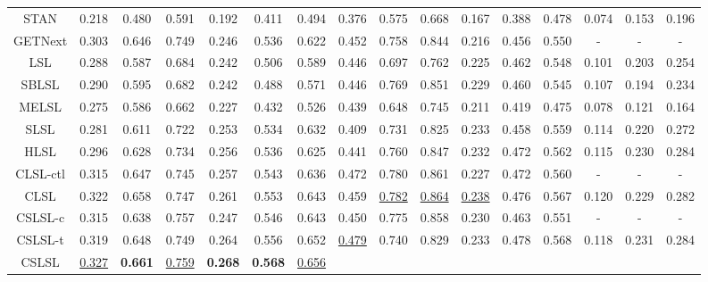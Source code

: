 \documentclass[sigconf]{acmart}
\begin{document}
\begin{table}[hbt]
{\begin{threeparttable}
\begin{tabular}{ccccccc|cccccc|ccc}
            STAN & 0.218 &  0.480 & 0.591  &  0.192  & 0.411 &  0.494 &  
                    0.376 & 0.575 & 0.668 &  0.167 & 0.388 & 0.478 & 
                    0.074 & 0.153 & 0.196 \\
            GETNext & 0.303 & 0.646 & 0.749 & 0.246 & 0.536 & 0.622 &  
                    0.452 & 0.758 & 0.844 & 0.216 & 0.456 & 0.550 & 
                    - & - & - \\
        \hline
            LSL  & 0.288 & 0.587 & 0.684 & 0.242 & 0.506 & 0.589 &  
                    0.446 & 0.697 & 0.762 & 0.225 & 0.462 & 0.548 &  
                    0.101 & 0.203 & 0.254 \\
            SBLSL & 0.290 & 0.595 & 0.682 & 0.242 & 0.488 & 0.571 &  
                    0.446 & 0.769 & 0.851 & 0.229 & 0.460 & 0.545 & 
                    0.107 & 0.194 & 0.234 \\
            MELSL & 0.275 & 0.586 & 0.662 & 0.227 & 0.432 & 0.526 &  
                    0.439 & 0.648 & 0.745 & 0.211 & 0.419 & 0.475 &
                    0.078 & 0.121 & 0.164 \\
            SLSL  & 0.281 & 0.611 & 0.722 & 0.253 & 0.534 & 0.632 &  
                    0.409 & 0.731 & 0.825 & 0.233 & 0.458 & 0.559 &
                    0.114 & 0.220 & 0.272 \\
            HLSL  & 0.296 & 0.628 & 0.734 & 0.256 & 0.536 & 0.625 &  
                    0.441 & 0.760 & 0.847 & 0.232 & 0.472 & 0.562 & 
                    0.115 & 0.230 & 0.284 \\
            CLSL-ctl & 0.315 & 0.647 & 0.745 & 0.257 & 0.543 & 0.636 &
            		  0.472 & 0.780 & 0.861 & 0.227 & 0.472 & 0.560 &
            		  - & - & - \\
        \hline
            CLSL & 0.322 & 0.658 & 0.747 & 0.261 & 0.553 & 0.643 &  
                   0.459 & \underline{0.782} & \underline{0.864} & \underline{0.238} & 0.476 & 0.567 & 
                   0.120 & 0.229 & 0.282 \\
            CSLSL-c & 0.315 & 0.638 & 0.757 & 0.247 & 0.546 & 0.643 &  
                    0.450 & 0.775 & 0.858 & 0.230 & 0.463 & 0.551 &  
                    - & - & - \\
            CSLSL-t & 0.319 & 0.648 & 0.749 & 0.264 & 0.556 & 0.652 &  
                    \underline{0.479} & 0.740 & 0.829 & 0.233 & 0.478 & 0.568 &
                    0.118 & 0.231 & 0.284 \\
            CSLSL & \underline{0.327} & \textbf{0.661} & \underline{0.759} & \textbf{0.268} & \textbf{0.568} & \underline{0.656} &  

\end{tabular}
\end{threeparttable}}
\end{table}
\end{document}
